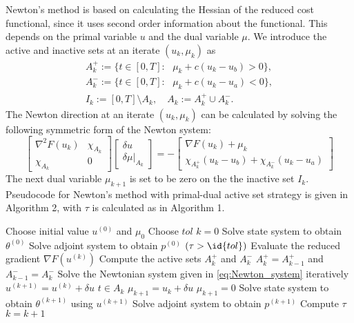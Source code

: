 Newton's method is based on calculating the Hessian of the reduced cost functional, since it uses second order information about the functional. This depends on the primal variable $u$ and the dual variable $\mu$. We introduce the active and inactive sets at an iterate $(u_k, \mu_k)$ as
\begin{align}
    \label{eq:active_inactive}
    A_k^{+} := \{ t \in [0,T]: \text{ } \mu_k + c(u_k - u_b) >0 \}, \\
    A_k^{-} := \{ t \in [0,T]: \text{ } \mu_k + c(u_k - u_a) <0 \}, \\
    I_k := [0,T] \setminus A_k, \quad A_k := A_k^{+} \cup A_k^{-}.
\end{align}
The Newton direction at an iterate $(u_k, \mu_k)$ can be calculated by solving the following symmetric form of the Newton system:
\begin{equation}
    \label{eq:Newton_system}
    \begin{bmatrix}
        \nabla^2 F(u_k) & \chi_{A_k} \\
        \chi_{A_k} & 0 
    \end{bmatrix}
    \begin{bmatrix}
    \delta u \\
    \delta \mu|_{A_k}
    \end{bmatrix}
    = - \begin{bmatrix}
    \nabla F(u_k) + \mu_k \\
    \chi_{A_k^{+}}(u_k - u_b) + \chi_{A_k^{-}}(u_k - u_a)
    \end{bmatrix}
\end{equation}
The next dual variable $\mu_{k+1}$ is set to be zero on the the inactive set $I_k$. Pseudocode for Newton's method with primal-dual active set strategy is given in Algorithm 2, with $\tau$ is calculated as in Algorithm 1.
\begin{codebox}
\li Choose initial value $u^{(0)}$ and $\mu_0$ 
\li Choose $tol$
\li $k = 0$
\li Solve state system to obtain $\theta^{(0)}$
\li Solve adjoint system to obtain $p^{(0)}$
\li \While $(\tau > \id{tol})$ \Then 
\li Evaluate the reduced gradient $\nabla F(u^{(k)})$
\li Compute the active sets $A_k^{+}$ and $A_k^{-}$
\li \If $A_k^{+} = A_{k-1}^{+}$ and $A_{k-1}^{-} = A_k^{-}$ \Then 
\li \Return \End
\li Solve the Newtonian system given in \eqref{eq:Newton_system} iteratively
\li $u^{(k+1)} = u^{(k)} + \delta u$  
\li \If $t \in A_k$ \Then
    \li $\mu_{k+1} = u_k + \delta u$
    \li \Else $\mu_{k+1} = 0$ 
    \End
\li Solve state system to obtain $\theta^{(k+1)}$ using $u^{(k+1)}$
\li Solve adjoint system to obtain $p^{(k+1)}$ 
\li Compute $\tau$
\li $k = k+1$
\end{codebox}

